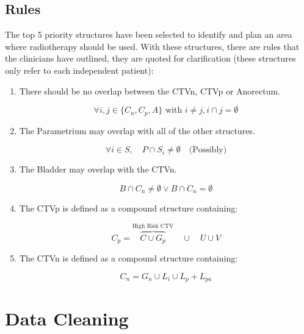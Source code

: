 \documentclass[11pt,twoside]{report}
\begin{document}
\subsection{Rules}

The top 5 priority structures have been selected to identify and plan an area where radiotherapy should be used. With these structures, there are rules that the clinicians have outlined, they are quoted for clarification (these structures only refer to each independent patient):

\begin{enumerate}
  \item There should be no overlap between the CTVn, CTVp or Anorectum. 
  
  \begin{equation}
    \forall{i,j \in \{C_n, C_p, A\}}\text{ with } i \neq j, i \cap j = \emptyset
  \end{equation}

  \item The Parametrium may overlap with all of the other structures.
  
  \begin{equation}
    \forall i \in S, \quad P \cap S_i \neq \emptyset \quad \text{(Possibly)}
  \end{equation}

  \item The Bladder may overlap with the CTVn.
  
  \begin{equation}
    B \cap C_n \neq \emptyset \vee B \cap C_n = \emptyset
  \end{equation}

  \item The CTVp is defined as a compound structure containing:
  
  \begin{equation}
    C_p = \overbrace{C \cup G_p}^{\text{High Risk CTV}} \quad \cup \quad U \cup V\label{eq:ctvp}
  \end{equation}

  \item The CTVn is defined as a compound structure containing: 
  
  \begin{equation}
    C_n = G_n \cup L_i \cup L_p + L_{pa}
  \end{equation}
  
\end{enumerate}

\section{Data Cleaning}\label{sect:data-cleaning}
\end{document}

